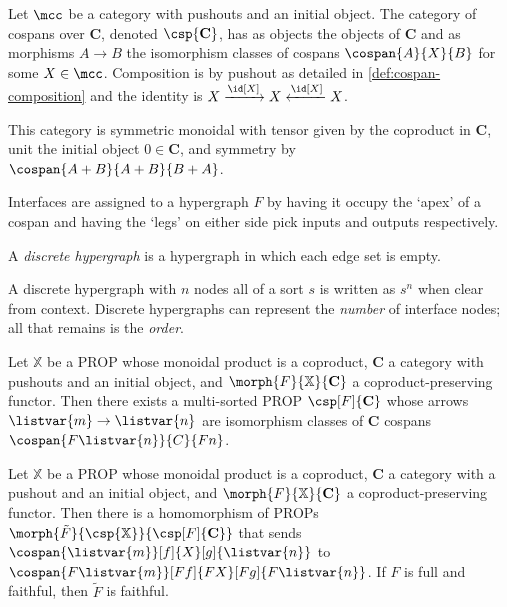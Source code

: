 \begin{definition}
    Let \(\mcc\) be a category with pushouts and an initial object.
    The category of cospans over \(\mathbf{C}\), denoted \(\csp{\mathbf{C}}\),
    has as objects the objects of \(\mathbf{C}\) and as morphisms \(A \to B\)
    the isomorphism classes of cospans \(\cospan{A}{X}{B}\) for some
    \(X \in \mcc\).
    Composition is by pushout as detailed in \cref{def:cospan-composition} and
    the identity is \(X \xrightarrow{\id[X]} X \xleftarrow{\id[X]} X\).

    This category is symmetric monoidal with tensor given by the coproduct in
    \(\mathbf{C}\), unit the initial object \(0 \in \mathbf{C}\), and symmetry
    by \(\cospan{A+B}{A+B}{B+A}\).
\end{definition}

Interfaces are assigned to a hypergraph \(F\) by having it occupy the `apex' of
a cospan and having the `legs' on either side pick inputs and outputs
respectively.

\begin{definition}
    A \emph{discrete hypergraph} is a hypergraph in which each edge set is
    empty.
\end{definition}

A discrete hypergraph with \(n\) nodes all of a sort \(s\) is written as \(s^n\)
when clear from context.
Discrete hypergraphs can represent the \emph{number} of interface nodes; all
that remains is the \emph{order}.

\begin{theorem}
    Let \(\mathbb{X}\) be a PROP whose monoidal product is a coproduct,
    \(\mathbf{C}\) a category with pushouts and an initial object, and \(
        \morph{F}{\mathbb{X}}{\mathbf{C}}
    \) a coproduct-preserving functor.
    Then there exists a multi-sorted PROP \(\csp[F]{\mathbf{C}}\) whose arrows
    \(\listvar{m} \to \listvar{n}\) are isomorphism classes of \(\mathbf{C}\)
    cospans \(\cospan{F\listvar{n}}{C}{Fn}\).
\end{theorem}



\begin{theorem}
    \label{thm:cospan-homomorphism}
    Let \(\mathbb{X}\) be a PROP whose monoidal product is a coproduct,
    \(\mathbf{C}\) a category with a pushout and an initial object, and
    \(\morph{F}{\mathbb{X}}{\mathbf{C}}\) a coproduct-preserving functor.
    Then there is a homomorphism of PROPs \(
        \morph{\tilde{F}}{\csp{\mathbb{X}}}{\csp[F]{\mathbf{C}}}
    \) that sends \(\cospan{\listvar{m}}[f]{X}[g]{\listvar{{n}}}\) to
    \(\cospan{F\listvar{m}}[Ff]{FX}[Fg]{F\listvar{n}}\).
    If \(F\) is full and faithful, then \(\tilde{F}\) is faithful.
\end{theorem}

